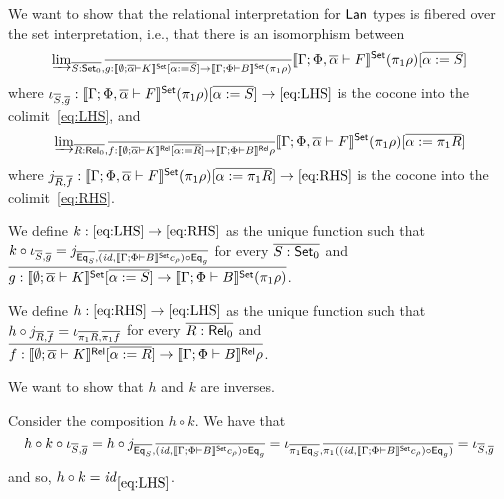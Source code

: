 \documentclass{lmcs}
\theoremstyle{plain}\newtheorem{satz}[thm]{Satz}
\newcommand{\set}{\mathsf{Set}}
\renewcommand{\id}{\mathit{id}}
\begin{document}
We want to show that the relational interpretation for $\mathsf{Lan}$ types is fibered over the set interpretation, i.e., that there is an isomorphism between
\begin{equation}\label{eq:LHS}
\colim{\ol{S : \set_0}, \ol{g : \setsem{\emptyset; \ol{\alpha} \vdash K}[\ol{\alpha := S}] \to \setsem{\Gamma; \Phi \vdash B}(\pi_1 \rho)}}
{\setsem{\Gamma; \Phi, \ol{\alpha} \vdash F}(\pi_1 \rho)[\ol{\alpha := S}]}
\end{equation}
where $\iota_{\ol{S}, \ol{g}} : \setsem{\Gamma; \Phi, \ol{\alpha} \vdash F}(\pi_1 \rho)[\ol{\alpha := S}] \to \eqref{eq:LHS}$ is the cocone into the colimit~\eqref{eq:LHS}, and
\begin{equation}\label{eq:RHS}
\colim{\ol{R : \rel_0}, \ol{f : \relsem{\emptyset; \ol{\alpha} \vdash K}[\ol{\alpha := R}] \to \relsem{\Gamma; \Phi \vdash B}\rho}}
{\setsem{\Gamma; \Phi, \ol{\alpha} \vdash F}(\pi_1 \rho)[\ol{\alpha := \pi_1 R}]}
\end{equation}
where $j_{\ol{R}, \ol{f}} : \setsem{\Gamma; \Phi, \ol{\alpha} \vdash F}(\pi_1 \rho)[\ol{\alpha := \pi_1 R}] \to \eqref{eq:RHS}$ is the cocone into the colimit~\eqref{eq:RHS}.

We define $k : \eqref{eq:LHS} \to \eqref{eq:RHS}$ as the unique function such that $k \circ \iota_{\ol{S}, \ol{g}} = j_{\ol{\Eq_S}, \ol{(\id, \setsem{\Gamma; \Phi \vdash B} c_\rho) \circ \Eq_g}}$ for every $\ol{S : \set_0}$ and $\ol{g : \setsem{\emptyset; \ol{\alpha} \vdash K}[\ol{\alpha := S}] \to \setsem{\Gamma; \Phi \vdash B}(\pi_1 \rho)}$.

We define $h : \eqref{eq:RHS} \to \eqref{eq:LHS}$ as the unique function such that $h \circ j_{\overline{R}, \overline{f}} = \iota_{\overline{\pi_1 R}, \overline{\pi_1 f}}$ for every $\overline{R : \mathsf{Rel}_0}$ and $\overline{f : \llbracket{\emptyset; \overline{\alpha} \vdash K}\rrbracket^{\mathsf{Rel}}[\overline{\alpha := R}] \to \llbracket{\Gamma; \Phi \vdash B}\rrbracket^{\mathsf{Rel}}\rho}$.

We want to show that $h$ and $k$ are inverses.

Consider the composition $h \circ k$.
We have that
\[
h \circ k \circ \iota_{\ol{S}, \ol{g}}
= h \circ j_{\ol{\Eq_S}, \ol{(\id, \setsem{\Gamma; \Phi \vdash B} c_\rho) \circ \Eq_g}}
= \iota_{\ol{\pi_1 \Eq_S}, \ol{\pi_1 ((\id, \setsem{\Gamma; \Phi \vdash B} c_\rho) \circ \Eq_g)}}
= \iota_{\ol{S}, \ol{g}}
\]
and so, $h \circ k = \id_{\eqref{eq:LHS}}$.
\end{document}

